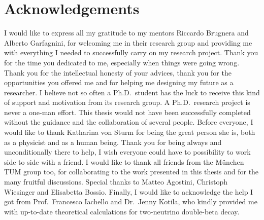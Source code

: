 
\chapter*{Acknowledgements}

I would like to express all my gratitude to my mentors Riccardo Brugnera and Alberto
Garfagnini, for welcoming me in their research group and providing me with everything I
needed to successfully carry on my research project. Thank you for the time you dedicated
to me, especially when things were going wrong. Thank you for the intellectual honesty of
your advices, thank you for the opportunities you offered me and for helping me designing
my future as a researcher. I believe not so often a Ph.D.~student has the luck to receive
this kind of support and motivation from its research group.
\newpar
A Ph.D.~research project is never a one-man effort. This thesis would not have been
successfully completed without the guidance and the collaboration of several people.
Before everyone, I would like to thank Katharina von Sturm for being the great person she
is, both as a physicist and as a human being. Thank you for being always and
unconditionally there to help, I wish everyone could have to possibility to work side to
side with a friend. I would like to thank all friends from the M\"unchen TUM group too,
for collaborating to the work presented in this thesis and for the many fruitful
discussions.  Special thanks to Matteo Agostini, Christoph Wiesinger and Elisabetta
Bossio.
\newpar
Finally, I would like to acknowledge the help I got from Prof.~Francesco Iachello and
Dr.~Jenny Kotila, who kindly provided me with up-to-date theoretical calculations for
two-neutrino double-beta decay.

\chapendgliph{}

